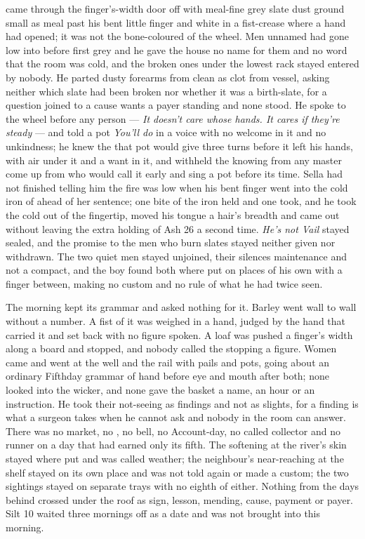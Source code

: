 came through the finger's-width door off  with meal-fine grey slate dust ground small as meal past his bent little finger and white in a fist-crease where a hand had opened; it was not the bone-coloured  of the wheel. Men unnamed had gone low into  before first grey and he gave the house no name for them and no word that the room was cold, and the broken ones under the lowest rack stayed entered by nobody. He parted dusty forearms from clean as clot from vessel, asking neither which slate had been broken nor whether it was a birth-slate, for a question joined to a cause wants a payer standing and none stood. He spoke to the wheel before any person --- \emph{It doesn't care whose hands. It cares if they're steady} --- and told a pot \emph{You'll do} in a voice with no welcome in it and no unkindness; he knew the  that pot would give three turns before it left his hands, with air under it and a want in it, and withheld the knowing from any master come up from  who would call it early and sing a pot before its time. Sella had not finished telling him the fire was low when his bent finger went into the cold iron of  ahead of her sentence; one bite of the iron held and one took, and he took the cold out of the fingertip, moved his tongue a hair's breadth and came out without leaving the extra holding of Ash 26 a second time. \emph{He's not Vail} stayed sealed, and the promise to the men who burn slates stayed neither given nor withdrawn. The two quiet men stayed unjoined, their silences maintenance and not a compact, and the boy found both where put on places of his own with a finger between, making no custom and no rule of what he had twice seen.

\scenebreak

The morning kept its grammar and asked nothing for it. Barley went wall to wall without a number. A fist of it was weighed in a hand, judged by the hand that carried it and set back with no figure spoken. A loaf was pushed a finger's width along a board and stopped, and nobody called the stopping a figure. Women came and went at the well and the rail with pails and pots, going about an ordinary Fifthday grammar of hand before eye and mouth after both; none looked into the wicker, and none gave the basket a name, an hour or an instruction. He took their not-seeing as findings and not as slights, for a finding is what a surgeon takes when he cannot ask and nobody in the room can answer. There was no market, no , no bell, no Account-day, no called collector and no runner on a day that had earned only its fifth. The softening at the river's skin stayed where put and was called weather; the neighbour's near-reaching at the shelf stayed on its own place and was not told again or made a custom; the two sightings stayed on separate trays with no eighth of either. Nothing from the days behind crossed under the roof as sign, lesson, mending, cause, payment or payer. Silt 10 waited three mornings off as a date and was not brought into this morning.

